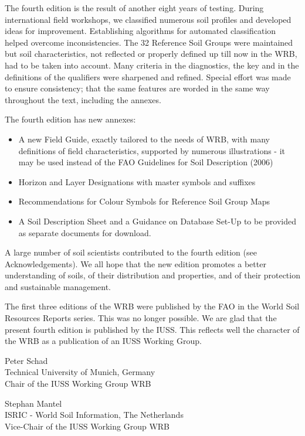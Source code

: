 \documentclass[
  letterpaper,
  DIV=11,
  numbers=noendperiod]{scrreprt}
\providecommand{\tightlist}{%
  \setlength{\itemsep}{0pt}\setlength{\parskip}{0pt}}\usepackage{longtable,booktabs,array}
\begin{document}
The fourth edition is the result of another eight years of testing.
During international field workshops, we classified numerous soil
profiles and developed ideas for improvement. Establishing algorithms
for automated classification helped overcome inconsistencies. The 32
Reference Soil Groups were maintained but soil characteristics, not
reflected or properly defined up till now in the WRB, had to be taken
into account. Many criteria in the diagnostics, the key and in the
definitions of the qualifiers were sharpened and refined. Special effort
was made to ensure consistency; that the same features are worded in the
same way throughout the text, including the annexes.

The fourth edition has new annexes:

\begin{itemize}
\tightlist
\item
  A new Field Guide, exactly tailored to the needs of WRB, with many
  definitions of field characteristics, supported by numerous
  illustrations - it may be used instead of the FAO Guidelines for Soil
  Description (2006)
\item
  Horizon and Layer Designations with master symbols and suffixes
\item
  Recommendations for Colour Symbols for Reference Soil Group Maps
\item
  A Soil Description Sheet and a Guidance on Database Set-Up to be
  provided as separate documents for download.
\end{itemize}

A large number of soil scientists contributed to the fourth edition (see
Acknowledgements). We all hope that the new edition promotes a better
understanding of soils, of their distribution and properties, and of
their protection and sustainable management.

The first three editions of the WRB were published by the FAO in the
World Soil Resources Reports series. This was no longer possible. We are
glad that the present fourth edition is published by the IUSS. This
reflects well the character of the WRB as a publication of an IUSS
Working Group.

Peter Schad\\
Technical University of Munich, Germany\\
Chair of the IUSS Working Group WRB

Stephan Mantel\\
ISRIC - World Soil Information, The Netherlands\\
Vice-Chair of the IUSS Working Group WRB
\end{document}
